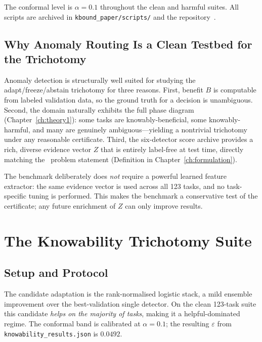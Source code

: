 The conformal level is $\alpha = 0.1$ throughout the clean and harmful suites.  All scripts
are archived in \texttt{kbound\_paper/scripts/} and the repository~\cite{kbound2026repo}.

\subsection{Why Anomaly Routing Is a Clean Testbed for the Trichotomy}

Anomaly detection is structurally well suited for studying the adapt/freeze/abstain
trichotomy for three reasons.  First, benefit $B$ is computable from labeled validation
data, so the ground truth for a decision is unambiguous.  Second, the domain naturally
exhibits the full phase diagram (Chapter~\ref{ch:theory1}): some tasks are
knowably-beneficial, some knowably-harmful, and many are genuinely ambiguous---yielding
a nontrivial trichotomy under any reasonable certificate.  Third, the six-detector score
archive provides a rich, diverse evidence vector $Z$ that is entirely label-free at test
time, directly matching the \KBound\ problem statement (Definition in
Chapter~\ref{ch:formulation}).

The benchmark deliberately does \emph{not} require a powerful learned feature extractor:
the same evidence vector is used across all 123 tasks, and no task-specific tuning is
performed.  This makes the benchmark a conservative test of the certificate; any future
enrichment of $Z$ can only improve results.

\section{The Knowability Trichotomy Suite}
\label{sec:exp1-trichotomy}

\subsection{Setup and Protocol}

The candidate adaptation is the rank-normalised logistic stack, a mild ensemble improvement
over the best-validation single detector.  On the clean 123-task suite this candidate
\emph{helps on the majority of tasks}, making it a helpful-dominated regime.  The conformal
band is calibrated at $\alpha = 0.1$; the resulting $\varepsilon$ from
\texttt{knowability\_results.json} is $0.0492$.

